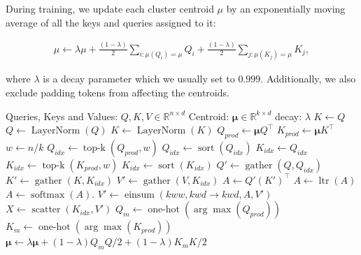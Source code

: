 During training, we update each cluster centroid \(\mu\) by an exponentially moving average of all the keys and queries assigned to it:

\begin{align*}
\mu \gets \lambda \mu + \frac{(1 - \lambda)}{2} \sum_{i: \mu(Q_i) = \mu} Q_i + \frac{(1 - \lambda)}{2} \sum_{j: \mu(K_j) = \mu} K_j,
\end{align*}

where \(\lambda\) is a decay parameter which we usually set to \(0.999\).
Additionally, we also exclude padding tokens from affecting the centroids.

\begin{algorithm}
\caption{Routing Attention}\label{alg:routing}
\begin{algorithmic}[1]
\State Queries, Keys and Values: $Q, K, V \in \mathbb{R}^{n \times d}$
\State Centroid: \(\bm{\mu} \in \mathbb{R}^{k \times d}\)
\State decay: \(\lambda\) 
\State $K \gets Q$
\EndIf
{}
\State $Q \gets \operatorname{LayerNorm}(Q)$ 
\State $K \gets \operatorname{LayerNorm}(K)$ 
\State $Q_{prod} \gets \bm{\mu} Q^\top$ 
\State $K_{prod} \gets \bm{\mu} K^\top$ 
\EndIf
\State \(w \gets n/k\) 
\State $Q_{idx} \gets \operatorname{top-k}(Q_{prod}, w) $ 
\State $Q_{idx} \gets \operatorname{sort}(Q_{idx})$ 
\State $K_{idx} \gets Q_{idx} $ 
\State $K_{idx} \gets \operatorname{top-k}(K_{prod}, w) $ 
\State $K_{idx} \gets \operatorname{sort}(K_{idx})$ 
\EndIf
\State \(Q' \gets \operatorname{gather}(Q, Q_{idx})\) 
\State \(K' \gets \operatorname{gather}(K, K_{idx})\) 
\State \(V' \gets \operatorname{gather}(V, K_{idx})\) 
\State $A \gets Q' (K')^\top$ 
\State \(A \gets \operatorname{ltr}(A)\)
\EndIf
\State $A \gets \operatorname{softmax}(A)$. 
\State \(V' \gets \operatorname{einsum}(kww, kwd \rightarrow kwd, A, V')\)
\State \(X \gets \operatorname{scatter}(K_{idx}, V')\) 
\State $Q_m \gets \operatorname{one-hot}(\arg\max(Q_{prod}))$ 
\State $K_m \gets \operatorname{one-hot}(\arg\max(K_{prod}))$ 
\State $\bm{\mu} \gets \lambda \bm{\mu} + (1 - \lambda)Q_mQ/2 + (1 - \lambda)K_mK/2$
\State {}
\end{algorithmic}
\end{algorithm}

